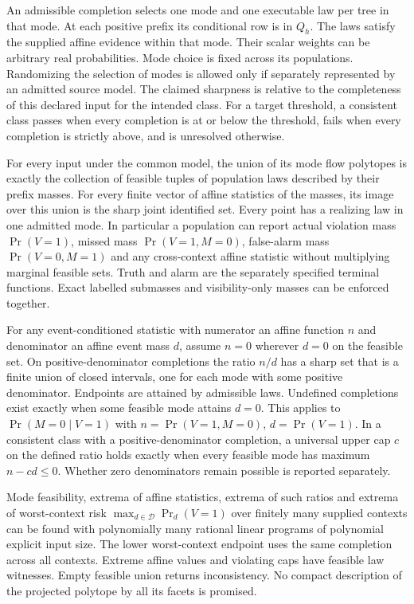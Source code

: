 An admissible completion selects one mode and one executable law per tree in that mode. At each positive prefix its conditional row is in \(Q_h\). The laws satisfy the supplied affine evidence within that mode. Their scalar weights can be arbitrary real probabilities. Mode choice is fixed across its populations. Randomizing the selection of modes is allowed only if separately represented by an admitted source model. The claimed sharpness is relative to the completeness of this declared input for the intended class. For a target threshold, a consistent class passes when every completion is at or below the threshold, fails when every completion is strictly above, and is unresolved otherwise.

\begin{theorem}\label{ext:t25j}

For every input under the common model, the union of its mode flow polytopes is exactly the collection of feasible tuples of population laws described by their prefix masses. For every finite vector of affine statistics of the masses, its image over this union is the sharp joint identified set. Every point has a realizing law in one admitted mode. In particular a population can report actual violation mass \(\Pr(V=1)\), missed mass \(\Pr(V=1,M=0)\), false-alarm mass \(\Pr(V=0,M=1)\) and any cross-context affine statistic without multiplying marginal feasible sets. Truth and alarm are the separately specified terminal functions. Exact labelled submasses and visibility-only masses can be enforced together.

For any event-conditioned statistic with numerator an affine function \(n\) and denominator an affine event mass \(d\), assume \(n=0\) wherever \(d=0\) on the feasible set. On positive-denominator completions the ratio \(n/d\) has a sharp set that is a finite union of closed intervals, one for each mode with some positive denominator. Endpoints are attained by admissible laws. Undefined completions exist exactly when some feasible mode attains \(d=0\). This applies to \(\Pr(M=0\mid V=1)\) with \(n=\Pr(V=1,M=0)\), \(d=\Pr(V=1)\). In a consistent class with a positive-denominator completion, a universal upper cap \(c\) on the defined ratio holds exactly when every feasible mode has maximum \(n-cd\le 0\). Whether zero denominators remain possible is reported separately.

Mode feasibility, extrema of affine statistics, extrema of such ratios and extrema of worst-context risk \(\max_{d\in\mathcal D}\Pr_d(V=1)\) over finitely many supplied contexts can be found with polynomially many rational linear programs of polynomial explicit input size. The lower worst-context endpoint uses the same completion across all contexts. Extreme affine values and violating caps have feasible law witnesses. Empty feasible union returns inconsistency. No compact description of the projected polytope by all its facets is promised.


\end{theorem}
